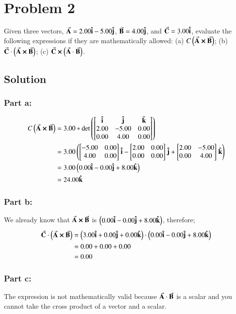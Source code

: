 \documentclass{article}
\begin{document}
\section*{Problem 2}
Given three vectors, $\va A = 2.00 \vu i - 5.00 \vu j$, $\va B = 4.00 \vu j$, and $\va C = 3.00 \vu i$, evaluate the following expressions if they are mathematically allowed:
(a) $C \left( \va A \cross \va B \right)$;
(b) $\va C \cdot \left(\va A \cross \va B \right)$;
(c) $\va C \cross \left(\va A \cdot \va B \right)$.

\subsection*{Solution}
\subsubsection*{Part a:}
\begin{align*}
	C \left( \va A \cross \va B \right) &= 3.00 * \det \left( \mqty[\vu i & \vu j & \vu k \\ 2.00 & -5.00 & 0.00 \\ 0.00 & 4.00 & 0.00] \right) \\
					    &= 3.00 \left( \mqty[-5.00 & 0.00 \\ 4.00 & 0.00]\ \vu i - \mqty[2.00 & 0.00 \\ 0.00 & 0.00]\ \vu j + \mqty[2.00 & -5.00 \\ 0.00 & 4.00]\ \vu k \right) \\
					    &= 3.00 \left( 0.00 \vu i - 0.00 \vu j + 8.00 \vu k \right) \\
					    &= 24.00 \vu k
\end{align*}

\subsubsection*{Part b:}
We already know that $\va A \cross \va B$ is $\left( 0.00 \vu i - 0.00 \vu j + 8.00 \vu k \right)$, therefore;
\begin{align*}
	\va C \cdot \left(\va A \cross \va B \right) &= \left( 3.00 \vu i + 0.00 \vu j + 0.00 \vu k \right) \cdot \left( 0.00 \vu i - 0.00 \vu j + 8.00 \vu k \right) \\
						     &= 0.00 + 0.00 + 0.00 \\
						     &= 0.00
\end{align*}

\subsubsection*{Part c:}
The expression is not mathematically valid  because $\va A \cdot \va B$ is a scalar and you cannot take the cross product of a vector and a scalar.
\end{document}
